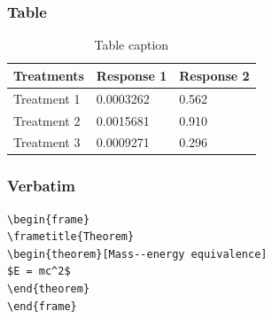 \documentclass{beamer}
\begin{document}
\begin{frame}
\frametitle{Table}
\begin{table}
\begin{tabular}{l l l}
\toprule
\textbf{Treatments} & \textbf{Response 1} & \textbf{Response 2}\\
\midrule
Treatment 1 & 0.0003262 & 0.562 \\
Treatment 2 & 0.0015681 & 0.910 \\
Treatment 3 & 0.0009271 & 0.296 \\
\bottomrule
\end{tabular}
\caption{Table caption}
\end{table}
\end{frame}


\begin{frame}[fragile] %
\frametitle{Verbatim}
\begin{example}
\begin{verbatim}
\begin{frame}
\frametitle{Theorem}
\begin{theorem}[Mass--energy equivalence]
$E = mc^2$
\end{theorem}
\end{frame}\end{verbatim}
\end{example}
\end{frame}
\end{document}
